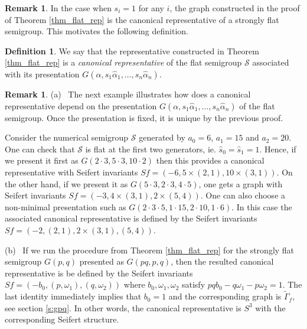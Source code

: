 \documentclass[oneside]{amsart}
\numberwithin{equation}{section}
\numberwithin{equation}{subsection}
\theoremstyle{plain}
\theoremstyle{definition}
\newtheorem{remark}[equation]{Remark}
\newtheorem{definition}[equation]{Definition}
\newcommand{\calS}{{\mathcal S}}\newcommand{\cals}{{\bf s}}\newcommand{\calst}{{\bf st}}\newcommand{\cS}{{\mathcal S}}
\newcommand{\al}{\alpha}
\newcommand{\z}[1]{\widehat{#1}}
\begin{document}
\begin{remark}\label{rem:CRSF}
In the case when $s_i=1$ for any $i$, the graph constructed in the proof of Theorem \ref{thm_flat_rep} is the canonical representative of a strongly flat semigroup. This motivates the following definition.  
\end{remark}


 \begin{definition}
 We say that the representative constructed in Theorem \ref{thm_flat_rep} is a 
 {\it canonical representative} of the flat semigroup $\calS$ associated with its presentation $G(\al,s_1\z{\al}_1,\dots,s_n\z{\al}_n)$. 
 \end{definition}
 
 \begin{remark}\label{rem:canrep}
(a) \ The next example illustrates how does a canonical representative depend on the presentation $G(\al,s_1\z{\al}_1,\dots,s_n\z{\al}_n)$ of the flat semigroup. Once the presentation is fixed, it is unique by the previous proof. 
  
 Consider the numerical semigroup $\calS$ generated by  $a_0=6$, $a_1=15$ and $a_2=20$. One can check that $\calS$ is flat at the first two generators, ie. $\widehat{s}_0=\widehat{s}_1=1$. Hence, if we present it  first  as  $G(2\cdot 3,5\cdot 3,10\cdot 2)$ then  this provides a canonical representative with Seifert invariants $Sf=(-6,5\times (2,1),10\times (3,1))$. On the other hand, if we present it as $G(5\cdot 3, 2\cdot 3, 4\cdot 5)$, one gets a graph with Seifert invariants $Sf=(-3,4\times(3,1),2\times (5,4))$. 
One can also choose a non-minimal presentation such as $G(2\cdot 3\cdot 5, 1\cdot 15,2\cdot 10,1\cdot 6)$. In this case the associated canonical representative is defined by the Seifert invariants $Sf=(-2, (2,1),2\times (3,1),(5,4))$. 
 
(b) \ If we run the procedure from Theorem \ref{thm_flat_rep} for the strongly flat semigroup $G(p,q)$ presented as $G(pq,p,q)$, then the resulted canonical representative is be defined by the Seifert invariants  $Sf=(-b_0, (p,\omega_1), (q, \omega_2))$ where $b_0,\omega_1,\omega_2$ satisfy $pqb_0-q\omega_1-p\omega_2=1$. The last identity immediately implies that $b_0=1$ and the corresponding graph is $\widetilde{\Gamma}_f$, see section \ref{s:gpq}. In other words, the canonical representative is $S^3$ with the corresponding Seifert structure.

 \end{remark}
\end{document}
